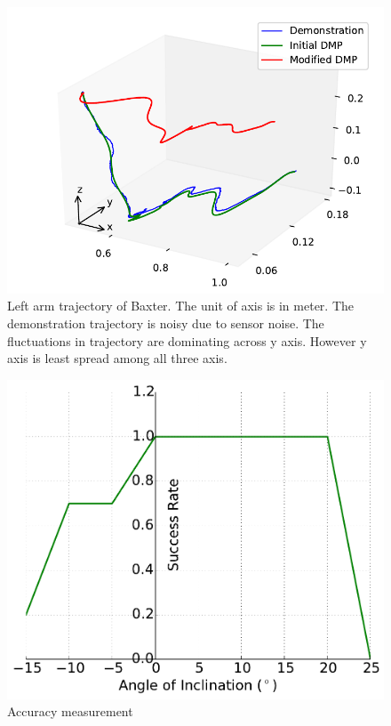 \documentclass[sigconf]{acmart}
\begin{document}
\begin{figure}
	\includegraphics[width=\linewidth]{all_traj}
	\caption{Left arm trajectory of Baxter. The unit of axis is in meter. The demonstration trajectory is noisy due to sensor noise. The fluctuations in trajectory are dominating across y axis. However y axis is least spread among all three axis.}
	\label{fig:trajectory}
\end{figure}

\begin{figure}
	\centering
	\includegraphics[width=\linewidth]{success_rate}
	\caption{Accuracy measurement}
	\label{fig:accuracy}
\end{figure}
\end{document}

